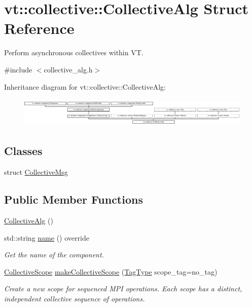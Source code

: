 \hypertarget{structvt_1_1collective_1_1_collective_alg}{}\section{vt\+:\+:collective\+:\+:Collective\+Alg Struct Reference}
\label{structvt_1_1collective_1_1_collective_alg}


Perform asynchronous collectives within VT.  




{\ttfamily \#include $<$collective\+\_\+alg.\+h$>$}

Inheritance diagram for vt\+:\+:collective\+:\+:Collective\+Alg\+:\begin{figure}[H]
\begin{center}
\leavevmode
\includegraphics[height=1.435897cm]{structvt_1_1collective_1_1_collective_alg}
\end{center}
\end{figure}
\subsection*{Classes}
\begin{DoxyCompactItemize}
\item 
struct \hyperlink{structvt_1_1collective_1_1_collective_alg_1_1_collective_msg}{Collective\+Msg}
\end{DoxyCompactItemize}
\subsection*{Public Member Functions}
\begin{DoxyCompactItemize}
\item 
\hyperlink{structvt_1_1collective_1_1_collective_alg_aa137479fb6afcfa33e73592ea3cbbcd8}{Collective\+Alg} ()
\item 
std\+::string \hyperlink{structvt_1_1collective_1_1_collective_alg_a81788afa34bc094c9f71fef8681aefb3}{name} () override
\begin{DoxyCompactList}\small\item\em Get the name of the component. \end{DoxyCompactList}\item 
\hyperlink{structvt_1_1collective_1_1_collective_scope}{Collective\+Scope} \hyperlink{structvt_1_1collective_1_1_collective_alg_a6f2b4c832a5cc11cb7dfc238ecd48edf}{make\+Collective\+Scope} (\hyperlink{namespacevt_a84ab281dae04a52a4b243d6bf62d0e52}{Tag\+Type} scope\+\_\+tag=no\+\_\+tag)
\begin{DoxyCompactList}\small\item\em Create a new scope for sequenced M\+PI operations. Each scope has a distinct, independent collective sequence of operations. \end{DoxyCompactList}\end{DoxyCompactItemize}
